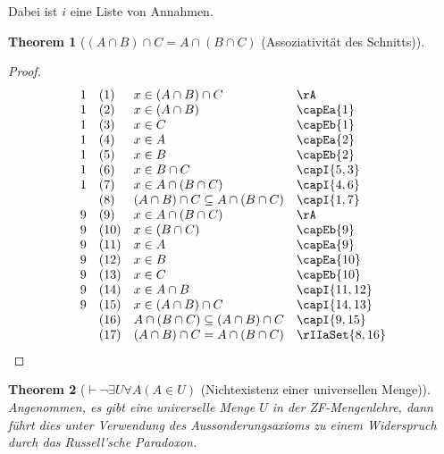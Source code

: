 \documentclass{book}
\theoremstyle{plain}
\newtheorem{theorem}{Theorem}
\theoremstyle{remark}
\theoremstyle{definition}
\begin{document}
Dabei ist \(i\) eine Liste von Annahmen. 

\label{LpAcaBRpcaCEqualsAcaLpBcaCRp}
\begin{theorem}[\((A \cap B) \cap C = A \cap (B \cap C)\) (Assoziativität des Schnitts)]
\end{theorem}
\begin{proof}
	\[
	\begin{array}{llll}
		1 & (1) & x \in (A \cap B) \cap C & \rA \\
		1 & (2) & x \in (A \cap B) & \capEa{1} \\
		1 & (3) & x \in C & \capEb{1} \\
		1 & (4) & x \in A & \capEa{2} \\
		1 & (5) & x \in B & \capEb{2} \\
		1 & (6) & x \in B\cap C & \capI{5,3} \\
		1 & (7) & x \in A\cap (B\cap C) & \capI{4,6} \\			
		& (8) & (A\cap B)\cap C\subseteq A\cap (B\cap C) & \capI{1,7} \\						
		9 & (9) & x \in A \cap (B \cap C) & \rA \\
		9 & (10) & x \in (B \cap C) & \capEb{9} \\
		9 & (11) & x \in A & \capEa{9} \\
		9 & (12) & x \in B & \capEa{10} \\
		9 & (13) & x \in C & \capEb{10} \\
		9 & (14) & x \in A\cap B & \capI{11,12} \\
		9 & (15) & x \in (A\cap B)\cap C & \capI{14,13} \\			
		& (16) & A\cap (B\cap C)\subseteq (A\cap B)\cap C & \capI{9,15} \\									
		& (17) & (A\cap B)\cap C=A\cap (B\cap C) & \rIIaSet{8,16} \\									
	\end{array}
	\]
\end{proof}

\label{ImpnExUFaALpAInURp}
\begin{theorem}[\(\vdash \neg \exists U \forall A (A \in U)\) (Nichtexistenz einer universellen Menge)]
	Angenommen, es gibt eine universelle Menge \( U \) in der ZF-Mengenlehre, dann führt dies unter Verwendung des Aussonderungsaxioms zu einem Widerspruch durch das Russell'sche Paradoxon. 
\end{theorem}
\end{document}
